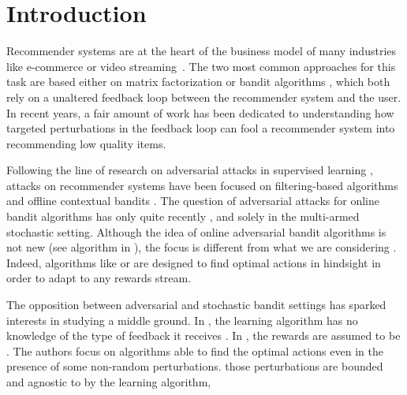 \section{Introduction}


Recommender systems are at the heart of the business model of many industries like e-commerce or video streaming~\cite{davidson2010youtube,gomez2015netflix}. The two most common approaches for this task are based either on matrix factorization \cite{park2017comparative} or bandit algorithms \cite{li2010contextual}, which both
rely on a unaltered feedback loop between the recommender system and the user. In recent years, a fair amount of work has been dedicated to understanding how targeted perturbations in the feedback loop can fool a recommender system into recommending low quality items.

Following the line of research on adversarial attacks in supervised learning \cite{biggio2012poisoning,goodfellow2014explaining, jagielski2018manipulating, li2016data, liu2017robust}, attacks on recommender systems have been focused on filtering-based algorithms \cite{10.1145/3298689.3347031, mehta2008attack} and offline contextual bandits \cite{ma2018data}.
The question of adversarial attacks for online bandit algorithms %
has only   quite recently \cite{jun2018adversarial, liu2019data, Immorlica2018AdversarialBW, guan2020robust}, and solely in the multi-armed stochastic setting.
Although the idea of online adversarial bandit algorithms is not new (see \expthree algorithm in \cite{auer2002finite}), the focus is different from what we are considering . Indeed, algorithms like \expthree or \expfour \cite{lattimore2018bandit} are designed to find optimal actions in hindsight in order to adapt to any rewards stream. 


 The opposition between adversarial and stochastic bandit settings has sparked interests in studying a middle ground.
 In \cite{bubeck2012best}, the learning algorithm has no knowledge of the type of feedback it receives . In \cite{lykouris2018stochastic, li2019stochastic, gupta2019better, Lykouris2019CorruptionRE, kapoor2019corruption}, the rewards are assumed to be . The authors focus on  algorithms able to find the optimal actions even in the presence of some non-random perturbations.  those perturbations are bounded and agnostic to  by the learning algorithm, 


